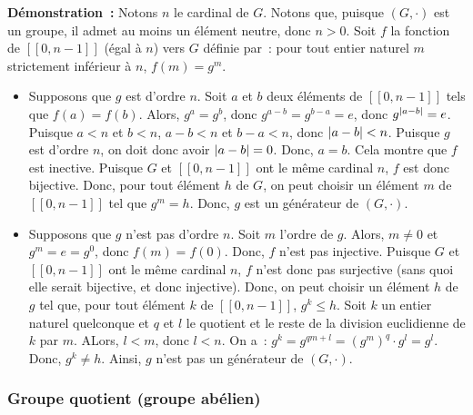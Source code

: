 \noindent\textbf{Démonstration :} 
Notons $n$ le cardinal de $G$.
Notons que, puisque $(G,\cdot)$ est un groupe, il admet au moins un élément neutre, donc $n > 0$.
Soit $f$ la fonction de $[\![0, n-1]\!]$ (égal à $n$) vers $G$ définie par : pour tout entier naturel $m$ strictement inférieur à $n$, $f(m) = g^m$.
\begin{itemize}[nosep]
    \item Supposons que $g$ est d'ordre $n$.
        Soit $a$ et $b$ deux éléments de $[\![0, n-1]\!]$ tels que $f(a) = f(b)$.
        Alors, $g^a = g^b$, donc $g^{a-b} = g^{b-a} = e$, donc $g^{\left\lvert a-b \right\rvert} = e$.
        Puisque $a < n$ et $b < n$, $a-b < n$ et $b-a < n$, donc $\left\lvert a-b \right\rvert < n$.
        Puisque $g$ est d'ordre $n$, on doit donc avoir $\left\lvert a-b \right\rvert = 0$.
        Donc, $a = b$.
        Cela montre que $f$ est inective.
        Puisque $G$ et $[\![0, n-1]\!]$ ont le même cardinal $n$, $f$ est donc bijective.
        Donc, pour tout élément $h$ de $G$, on peut choisir un élément $m$ de $[\![0, n-1]\!]$ tel que $g^m = h$.
        Donc, $g$ est un générateur de $(G,\cdot)$.
    \item Supposons que $g$ n'est pas d'ordre $n$. 
        Soit $m$ l'ordre de $g$.
        Alors, $m \neq 0$ et $g^m = e = g^0$, donc $f(m) = f(0)$.
        Donc, $f$ n'est pas injective.
        Puisque $G$ et $[\![0, n-1]\!]$ ont le même cardinal $n$, $f$ n'est donc pas surjective (sans quoi elle serait bijective, et donc injective).
        Donc, on peut choisir un élément $h$ de $g$ tel que, pour tout élément $k$ de $[\![0, n-1]\!]$, $g^k \leq h$.
        Soit $k$ un entier naturel quelconque et $q$ et $l$ le quotient et le reste de la division euclidienne de $k$ par $m$. 
        ALors, $l < m$, donc $l < n$.
        On a : $g^k = g^{q m + l} = (g^m)^q \cdot g^l = g^l$.
        Donc, $g^k \neq h$.
        Ainsi, $g$ n'est pas un générateur de $(G,\cdot)$.
\end{itemize}

\done

\subsubsection{Groupe quotient (groupe abélien)}


